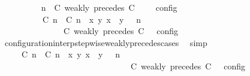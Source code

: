 \begin{isabellebody}
\ \ \ \ \ \ \isamarkupfalse%
\ {\isacartoucheopen}{\isasymlbrakk}\ {\isasymGamma}{\isacharcomma}\ n\ {\isasymturnstile}\ {\isacharparenleft}{\isacharparenleft}C\ weakly\ precedes\ C\ {\isacharhash}\ {\isasymPsi}{\isacharparenright}\ {\isasymtriangleright}\ {\isasymPhi}\ {\isasymrbrakk}\isactrlsub c\isactrlsub o\isactrlsub n\isactrlsub f\isactrlsub i\isactrlsub g\ {\isacharequal}\isanewline
\ \ \ \ \ \ \ \ {\isasymlbrakk}\ {\isacharparenleft}{\isacharparenleft}{\isasymlceil}{\isacharhash}\isactrlsup {\isasymle}\ C\ n{\isacharcomma}\ {\isacharhash}\isactrlsup {\isasymle}\ C\ n{\isasymrceil}\ {\isasymin}\ {\isacharparenleft}{\isasymlambda}{\isacharparenleft}x{\isacharcomma}\ y{\isacharparenright}{\isachardot}\ x\ {\isasymle}\ y{\isacharparenright}{\isacharparenright}\ {\isacharhash}\ {\isasymGamma}{\isacharparenright}{\isacharcomma}\ n\isanewline
\ \ \ \ \ \ \ \ \ \ \ \ {\isasymturnstile}\ {\isasymPsi}\ {\isasymtriangleright}\ {\isacharparenleft}{\isacharparenleft}C\ weakly\ precedes\ C\ {\isacharhash}\ {\isasymPhi}{\isacharparenright}\ {\isasymrbrakk}\isactrlsub c\isactrlsub o\isactrlsub n\isactrlsub f\isactrlsub i\isactrlsub g{\isacartoucheclose}\isanewline
\ \ \ \ \ \ \ \ \isamarkupfalse%
\ configuration{\isacharunderscore}interp{\isacharunderscore}stepwise{\isacharunderscore}weakly{\isacharunderscore}precedes{\isacharunderscore}cases\ \isamarkupfalse%
\ simp\isanewline
\ \ \ \ \ \ \isamarkupfalse%
\ \isamarkupfalse%
\ {\isacartoucheopen}{\isasymrho}\ {\isasymin}\ {\isasymlbrakk}\ {\isacharparenleft}{\isacharparenleft}{\isasymlceil}{\isacharhash}\isactrlsup {\isasymle}\ C\ n{\isacharcomma}\ {\isacharhash}\isactrlsup {\isasymle}\ C\ n{\isasymrceil}\ {\isasymin}\ {\isacharparenleft}{\isasymlambda}{\isacharparenleft}x{\isacharcomma}\ y{\isacharparenright}{\isachardot}\ x\ {\isasymle}\ y{\isacharparenright}{\isacharparenright}\ {\isacharhash}\ {\isasymGamma}{\isacharparenright}{\isacharcomma}\ n\isanewline
\ \ \ \ \ \ \ \ \ \ \ \ \ \ \ \ \ \ \ \ \ \ \ \ \ \ \ \ {\isasymturnstile}\ {\isasymPsi}\ {\isasymtriangleright}\ {\isacharparenleft}{\isacharparenleft}C\ weakly\ precedes\ C\ {\isacharhash}\ {\isasymPhi}{\isacharparenright}\ {\isasymrbrakk}\isactrlsub c\isactrlsub o\isactrlsub n\isactrlsub f\isactrlsub i\isactrlsub g\isanewline

\end{isabellebody}

